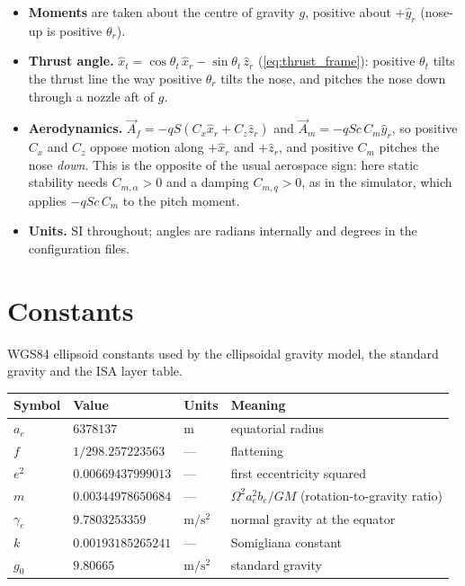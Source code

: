 \begin{itemize}
    $-l\,\hat{x}_r$; the radial offset $r$ is along $-\hat{z}_r$, so it sits at $-r\,\hat{z}_r$.
    \item \textbf{Moments} are taken about the centre of gravity $g$, positive about $+\hat{y}_r$
    (nose-up is positive $\theta_r$).
    \item \textbf{Thrust angle.} $\hat{x}_t=\cos\theta_t\,\hat{x}_r-\sin\theta_t\,\hat{z}_r$
    (\autoref{eq:thrust_frame}): positive $\theta_t$ tilts the thrust line the way positive
    $\theta_r$ tilts the nose, and pitches the nose down through a nozzle aft of $g$.
    \item \textbf{Aerodynamics.} $\vec{A}_f=-qS\left(C_x\hat{x}_r+C_z\hat{z}_r\right)$ and
    $\vec{A}_m=-qSc\,C_m\hat{y}_r$, so positive $C_x$ and $C_z$ oppose motion along $+\hat{x}_r$
    and $+\hat{z}_r$, and positive $C_m$ pitches the nose \emph{down}. This is the opposite of the
    usual aerospace sign: here static stability needs $C_{m,\alpha}>0$ and a damping
    $C_{m,q}>0$, as in the simulator, which applies $-qSc\,C_m$ to the pitch moment.
    \item \textbf{Units.} SI throughout; angles are radians internally and degrees in the
    configuration files.
\end{itemize}

\section{Constants}\label{sec:constants}
WGS84 ellipsoid constants used by the ellipsoidal gravity model, the standard gravity and the ISA
layer table.
\begin{center}
\small
\begin{tabular}{l l l l}
\hline
\textbf{Symbol} & \textbf{Value} & \textbf{Units} & \textbf{Meaning} \\
\hline
$a_e$ & $6378137$ & m & equatorial radius \\
$f$ & $1/298.257223563$ & --- & flattening \\
$e^2$ & $0.00669437999013$ & --- & first eccentricity squared \\
$m$ & $0.00344978650684$ & --- & $\Omega^2a_e^2b_e/GM$ (rotation-to-gravity ratio) \\
$\gamma_e$ & $9.7803253359$ & $\mathrm{m/s^2}$ & normal gravity at the equator \\
$k$ & $0.00193185265241$ & --- & Somigliana constant \\
$g_0$ & $9.80665$ & $\mathrm{m/s^2}$ & standard gravity \\
\hline
\end{tabular}
\end{center}

